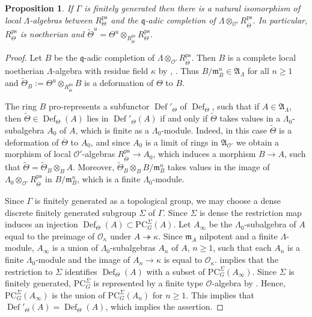 \documentclass{amsart}
\newtheorem{prop}{Proposition}[section]
\theoremstyle{definition}
\theoremstyle{remark}
\DeclareMathOperator{\Def}{Def}
\newcommand{\Aa}{\mathfrak A}
\newcommand{\mm}{\mathfrak m}
\newcommand{\OO}{\mathcal O}
\newcommand{\qq}{\mathfrak{q}}
\newcommand{\PC}{\mathrm{PC}}
\newcommand{\Thetabar}{\overline{\Theta}}
\newcommand{\ps}{\mathrm{ps}}
\newcommand{\wTheta}{\widetilde{\Theta}}
\begin{document}
\begin{prop}\label{fg_kappa} If $\Gamma$ is finitely generated then there is a natural
isomorphism of local $\Lambda$-algebras between $R^{\ps}_{\Theta}$ and 
the $\qq$-adic completion of $\Lambda\otimes_{\OO'} R^{\ps}_{\Thetabar}$.
In particular, $R^{\ps}_{\Theta}$ is noetherian and $\wTheta^u= \Theta^u\otimes_{R^{\ps}_{\Thetabar}} R^{\ps}_{\Theta}$.
\end{prop}
\begin{proof} Let $B$ be the $\qq$-adic completion of $\Lambda\otimes_{\OO'} R^{\ps}_{\Thetabar}$. Then $B$ is a complete local noetherian $\Lambda$-algebra
with residue field $\kappa$ by \cite[Lemma 3.3.5]{BJ_new}, \cite[Lemma 3.36]{BIP_new}.
Thus $B/\mm_B^n \in \Aa_{\Lambda}$ for all $n\ge 1$ and $\wTheta_B:= \Theta^u\otimes_{R^{\ps}_{\Thetabar}} B$ is a deformation of $\Theta$ to $B$. 

The ring $B$ pro-represents a subfunctor $\Def'_{\Theta}$ of $\Def_{\Theta}$, such 
that if $A\in \Aa_{\Lambda}$, then $\wTheta\in \Def_{\Theta}(A)$ lies in $\Def'_{\Theta}(A)$ if and only if 
$\wTheta$ takes values in a $\Lambda_0$-subalgebra $A_0$ of $A$, which is finite 
as a $\Lambda_0$-module. 
Indeed, in this case $\wTheta$ is a deformation of $\Thetabar$ to $A_0$, and 
since $A_0$ is a limit of rings in $\Aa_{\OO'}$ we obtain a morphism of local 
$\OO'$-algebras $R^{\ps}_{\Thetabar}\rightarrow A_0$, which induces 
a morphism $B\rightarrow A$, such that $\wTheta= \wTheta_B\otimes_B A$. Moreover, 
$\wTheta_B \otimes_B B/\mm_B^n$ takes values in 
the image of $\Lambda_0\otimes_{\OO'} R^{\ps}_{\Thetabar}$ in 
$B/\mm_B^n$, which is a finite $\Lambda_0$-module. 

Since $\Gamma$ is finitely generated as a topological group, we may choose a dense 
discrete finitely generated subgroup $\Sigma$ of $\Gamma$. Since $\Sigma$ is dense 
the restriction map induces an injection $\Def_{\Theta}(A) \subset \PC^{\Sigma}_G(A)$.
Let $A_{\infty}$ be the $\Lambda_0$-subalgebra of $A$ equal to the preimage of 
$\OO_{\kappa}$ under $A\twoheadrightarrow \kappa$. Since $\mm_A$ nilpotent 
and a finite $\Lambda$-module, $A_{\infty}$ is a union of $\Lambda_0$-subalgebras 
$A_n$ of $A$, $n\ge 1$, such that each $A_n$ is a finite $\Lambda_0$-module and 
the image of $A_n \rightarrow \kappa$ is equal to $\OO_{\kappa}$. 
 implies that the restriction to $\Sigma$ identifies 
$\Def_{\Theta}(A)$ with a subset of $\PC^{\Sigma}_G(A_{\infty})$. 
Since $\Sigma$ is finitely generated, $\PC^{\Sigma}_G$ is represented 
by a finite type  $\OO$-algebra by \cite[Proposition 3.21]{quast}. Hence, $\PC^{\Sigma}_G(A_{\infty})$ 
is the union of $\PC^{\Sigma}_G(A_n)$ for $n\ge 1$. This implies that 
$\Def'_{\Theta}(A)=\Def_{\Theta}(A)$, which implies the assertion.
\end{proof}
\end{document}
